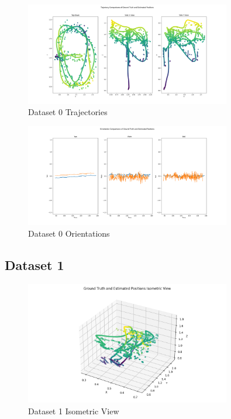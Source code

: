 \documentclass{article}
\begin{document}
\begin{figure}[H]
    \centering
    \includegraphics[width=0.8\textwidth]{./imgs/task1_2/studentdata0_trajectory_merged.png}
    \caption{Dataset 0 Trajectories}
\end{figure}

\begin{figure}[H]
    \centering
    \includegraphics[width=0.8\textwidth]{./imgs/task1_2/studentdata0_orientation_merged.png}
    \caption{Dataset 0 Orientations}
\end{figure}

\subsection*{Dataset 1}

\begin{figure}[H]
    \centering
    \includegraphics[width=0.8\textwidth]{./imgs/task1_2/studentdata1_isometric.png}
    \caption{Dataset 1 Isometric View}
\end{figure}
\end{document}
